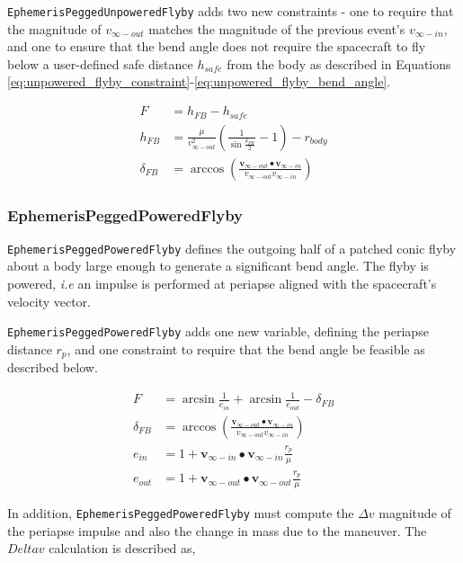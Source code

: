 \texttt{EphemerisPeggedUnpoweredFlyby} adds two new constraints - one to require that the magnitude of $v_{\infty-out}$ matches the magnitude of the previous event's $v_{\infty-in}$, and one to ensure that the bend angle does not require the spacecraft to fly below a user-defined safe distance $h_{safe}$ from the body as described in Equations \ref{eq:unpowered_flyby_constraint}-\ref{eq:unpowered_flyby_bend_angle}.

\begin{align}
	\label{eq:unpowered_flyby_constraint}
	F &= h_{FB} - h_{safe}\\
	\label{eq:unpowered_flyby_altitude}
	h_{FB} &= \frac{\mu}{v^2_{\infty-out}} \left( \frac{1}{\sin \frac{\delta_{FB}}{2}} - 1\right) - r_{body}\\
	\label{eq:unpowered_flyby_bend_angle}
	\delta_{FB} &= \arccos \left( \frac{\mathbf{v}_{\infty-out} \bullet \mathbf{v}_{\infty-in}}{v_{\infty-out} v_{\infty-in}} \right)
\end{align}

\subsubsection{EphemerisPeggedPoweredFlyby}
\label{subsubsec:EphemerisPeggedPoweredFlyby}

\texttt{EphemerisPeggedPoweredFlyby} defines the outgoing half of a patched conic flyby about a body large enough to generate a significant bend angle. The flyby is powered, \textit{i.e} an impulse is performed at periapse aligned with the spacecraft's velocity vector.

\texttt{EphemerisPeggedPoweredFlyby} adds one new variable, defining the periapse distance $r_p$, and one constraint to require that the bend angle be feasible as described below.

\begin{align}
	\label{eq:powered_flyby_turn_angle}
	F &= \arcsin\frac{1}{e_{in}} + \arcsin\frac{1}{e_{out}} - \delta_{FB}\\
	\delta_{FB} &= \arccos \left( \frac{\mathbf{v}_{\infty-out} \bullet \mathbf{v}_{\infty-in}}{v_{\infty-out} v_{\infty-in}} \right)\\
	e_{in} &= 1 + \mathbf{v}_{\infty-in} \bullet \mathbf{v}_{\infty-in} \frac{r_p}{\mu}\\
	e_{out} &= 1 + \mathbf{v}_{\infty-out} \bullet \mathbf{v}_{\infty-out} \frac{r_p}{\mu}
\end{align}

In addition, \texttt{EphemerisPeggedPoweredFlyby} must compute the $\Delta v$ magnitude of the periapse impulse and also the change in mass due to the maneuver. The $Delta v$ calculation is described as,


